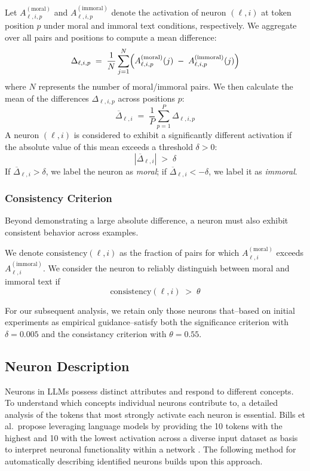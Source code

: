 \documentclass[runninghheads]{llncs}
\begin{document}
Let \(A^{(\mathrm{moral})}_{\ell, i, p}\) and \(A^{(\mathrm{immoral})}_{\ell, i, p}\)  denote the activation of neuron  \((\ell, i)\) at token position \(p\) under moral and immoral text conditions, respectively. We aggregate over all pairs and positions to compute a mean difference:
\[
\Delta_{\ell,i, p} \;=\; \frac{1}{N} \sum_{j=1}^{N}\Bigl(A^{(\mathrm{moral})}_{\ell, i, p}(j) \;-\; A^{(\mathrm{immoral})}_{\ell, i, p}(j)\Bigr)
\]
where \(N\) represents the number of moral/immoral pairs. We then calculate the mean of the differences
\(\Delta_{\ell, i, p}\) across positions \(p\): 
\[
\overline{\Delta}_{\ell, i} \;=\; \frac{1}{P} \sum_{p=1}^{P}\Delta_{\ell, i, p}
\]
A neuron \((\ell, i)\) is considered to exhibit a significantly different activation if the absolute value of this mean exceeds a threshold $\delta > 0$:
\[
|\overline{\Delta}_{\ell, i}| \;>\;\delta
\]
If \(\overline{\Delta}_{\ell, i} > \delta\), we label the neuron as \emph{moral}; if \(\overline{\Delta}_{\ell, i} < -\delta\), we label it as \emph{immoral}.  





\subsubsection{Consistency Criterion}
Beyond demonstrating a large absolute difference, a neuron must also exhibit consistent behavior across examples.

We denote \(\mathrm{consistency}(\ell, i)\) as the fraction of pairs for which \(A^{(\mathrm{moral})}_{\ell, i}\) exceeds \(A^{(\mathrm{immoral})}_{\ell, i}\). We consider the neuron to reliably distinguish between moral and immoral text if 
$$
\mathrm{consistency}(\ell, i) \;>\; \theta
$$

For our subsequent analysis, we retain only those neurons that--based on initial experiments as empirical guidance--satisfy both the significance criterion with $\delta=0.005$ and the consistancy criterion with $\theta=0.55$.
 

\subsection{Neuron Description}
Neurons in LLMs possess distinct attributes and respond to different concepts. 
To understand which concepts individual neurons contribute to, a detailed analysis of the tokens that most strongly activate each neuron is essential. 
Bills et al.~propose leveraging language models by providing the 10 tokens with the highest and 10 with the lowest activation across a diverse input dataset as basis to interpret neuronal functionality within a network \cite{bills2023language}. 
The following method for automatically describing identified neurons builds upon this approach.
\end{document}
